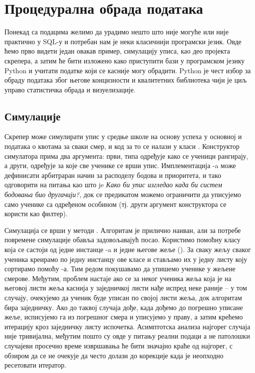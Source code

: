 \chapter{Процедурална обрада података}\label{ch:\thechapter}

Понекад са подацима желимо да урадимо нешто што није могуће или није практично у SQL-у и потребан нам је неки класичнији програмски језик. Овде ћемо прво видети један овакав пример, симулацију уписа, као део пројекта скрепера, а затим ће бити изложено како приступити бази у програмском језику Python и учитати податке који се касније могу обрадити. Python је чест избор за обраду података због његове концизности и квалитетних библиотека чији је циљ управо статистичка обрада и визуелизације.

\section{Симулације}

Скрепер може симулирати упис у средње школе на основу успеха у основној и података о квотама за сваки смер, и код за то се налази у класи . Конструктор симулатора прима два аргумента: први, типа  одређује како се ученици рангирају, а други,  одређује за које све ученике се врши упис. Имплементација -a може дефинисати арбитраран начин за расподелу бодова и приоритета, и тако одговорити на питања као што je \emph{Како би упис изгледао када би систем бодовања био другачији?}, док се предикатом можемо ограничити да уписујемо само ученике са одређеном особином (тј. други аргумент конструктора се користи као филтер). 

Симулација се врши у методи . Алгоритам је прилично наиван, али за потребе повремене симулације обавља задовољавајућ посао. Користимо помоћну класу  која се састоји од једне инстанце -a и једне његове жеље (). За сваку жељу сваког ученика креирамо по једну инстанцу ове класе и стављамо их у једну листу коју сортирамо помоћу -а. Тим редом покушавамо да упишемо ученике у жељене смерове. Међутим, проблем настаје ако се за неког ученика жеља која је на његовој листи жеља каснија у заједничкој листи нађе испред неке раније -- у том случају, очекујемо да ученик буде уписан по својој листи жеља, док алгоритам бира заједничку. Ако до таквој случаја дође, када дођемо до погрешно уписане жеље, исписујемо га из погрешног смера и уписујемо у праву, а затим крећемо итерацију кроз заједничку листу испочетка. Асимптотска анализа најгорег случаја није тривијална, међутим пошто су овде у питању реални подаци а не патолошки случајеви просечно време извршавања ће бити значајно краће од најгорег, с обзиром да се не очекује да често долази до корекције када је неопходно ресетовати итератор. %

